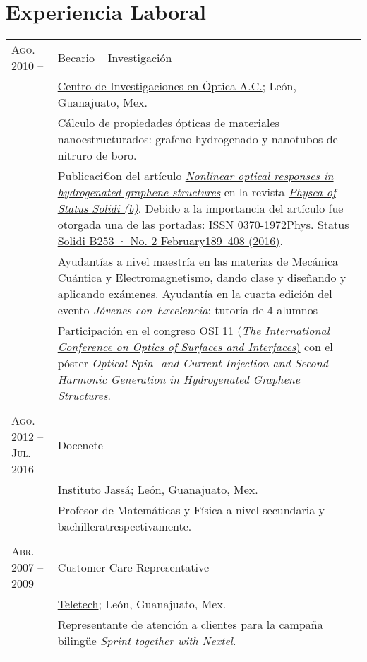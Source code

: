 \documentclass[letterpaper,10pt]{article}
\begin{document}
\section{Experiencia Laboral}
\begin{tabular}{R{4cm}|p{11cm}}
\textsc{Ago. 2010 --}	&	Becario -- Investigaci\'on \\
						&	\href{http://www.cio.mx/}{Centro de Investigaciones en \'Optica A.C.}; Le\'on, Guanajuato, Mex.\\
						&	\footnotesize{C\'alculo de propiedades \'opticas de materiales nanoestructurados: grafeno hydrogenado y nanotubos de nitruro de boro.}\\
						&	\footnotesize{Publicaci€on del art\'iculo \emph{\href{http://onlinelibrary.wiley.com/doi/10.1002/pssb.201670511/abstract}{Nonlinear optical responses in hydrogenated graphene structures}} en la revista \href{http://onlinelibrary.wiley.com/journal/10.1002/(ISSN)1521-3951}{\emph{Physca of Status Solidi (b)}}. Debido a la importancia del art\'iculo fue otorgada una de las portadas: \href{http://onlinelibrary.wiley.com/doi/10.1002/pssb.201670511/epdf}{ISSN 0370-1972Phys. Status Solidi B253 · No. 2 February189–408 (2016)}.} \\
						&	\footnotesize{Ayudant\'ias a nivel maestr\'ia en las materias de Mec\'anica Cu\'antica y Electromagnetismo, dando clase y dise\~nando y aplicando ex\'amenes. Ayudant\'ia en la cuarta edición del evento \emph{J\'ovenes con Excelencia}: tutoría de 4 alumnos}\\
						&	\footnotesize{Participaci\'on en el congreso \href{http://www.osiconference.org/osi2015/index.php}{OSI 11 (\emph{The International Conference on Optics of Surfaces and Interfaces})} con el p\'oster \emph{Optical Spin- and Current Injection and Second Harmonic Generation in Hydrogenated Graphene Structures}.}\\
						 \\
\textsc{Ago. 2012 -- Jul. 2016 }	&	Docenete \\
						&	\href{http://www.institutojassa.edu.mx/}{Instituto Jass\'a}; Le\'on, Guanajuato, Mex.\\
						&	\footnotesize{Profesor de Matem\'aticas y F\'isica a nivel secundaria y bachilleratrespectivamente.}\\
						 \\
\textsc{Abr. 2007 -- 2009}	&	Customer Care Representative\\
							&	\href{http://www.teletech.com/worldwide/spanish}{Teletech}; Le\'on, Guanajuato, Mex.\\
							&	\footnotesize{Representante de atenci\'on a clientes para la campa\~na biling\"ue \emph{Sprint together with Nextel}.}\\
							 \\
\end{tabular}
\end{document}
